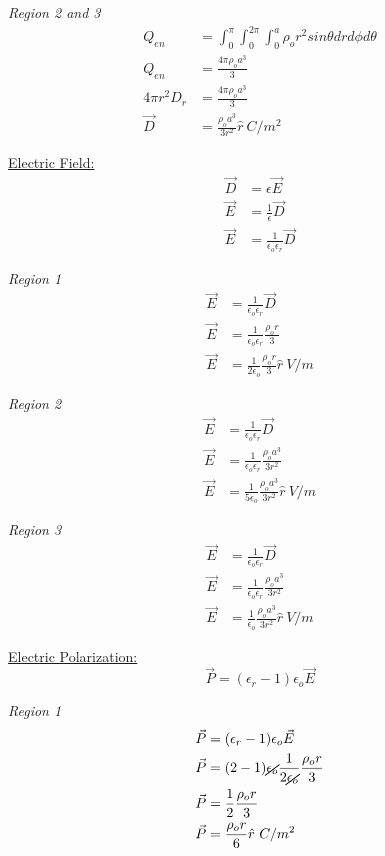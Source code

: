 \documentclass[12pt]{article}
\begin{document}
\textit{Region 2 and 3}			
	\begin{align*}
		Q_{en} &= \int_0^\pi \int_0^{2\pi} \int_0^a \rho_o r^2 sin\theta dr d\phi d\theta \\	
		Q_{en} &= \frac{4\pi \rho_o a^3}{3} \\
		4\pi r^2 D_r &= \frac{4\pi \rho_o a^3}{3} \\
		\vec{D} &= \frac{\rho_o a^3}{3 r^2} \hat{r}~C/m^2
	\end{align*}
		
\underline{Electric Field:}
	\begin{align*}
		\vec{D} &= \epsilon \vec{E} \\
		\vec{E} &= \frac{1}{\epsilon} \vec{D} \\
		\vec{E} &= \frac{1}{\epsilon_o \epsilon_r} \vec{D}
	\end{align*}
	
\textit{Region 1}			
	\begin{align*}
		\vec{E} &= \frac{1}{\epsilon_o \epsilon_r} \vec{D} \\
		\vec{E} &= \frac{1}{\epsilon_o \epsilon_r} \frac{\rho_o r}{3} \\
		\vec{E} &= \frac{1}{2 \epsilon_o} \frac{\rho_o r}{3} \hat{r}~V/m
	\end{align*}
	
\textit{Region 2}			
	\begin{align*}
		\vec{E} &= \frac{1}{\epsilon_o \epsilon_r} \vec{D} \\
		\vec{E} &= \frac{1}{\epsilon_o \epsilon_r} \frac{\rho_o a^3}{3 r^2} \\
		\vec{E} &= \frac{1}{5 \epsilon_o} \frac{\rho_o a^3}{3 r^2} \hat{r}~V/m
	\end{align*}
	
\textit{Region 3}			
	\begin{align*}
		\vec{E} &= \frac{1}{\epsilon_o \epsilon_r} \vec{D} \\
		\vec{E} &= \frac{1}{\epsilon_o \epsilon_r} \frac{\rho_o a^3}{3 r^2} \\
		\vec{E} &= \frac{1}{\epsilon_o} \frac{\rho_o a^3}{3 r^2} \hat{r}~V/m
	\end{align*}
		
\underline{Electric Polarization:}
	$$\vec{P} = (\epsilon_r - 1)\epsilon_o \vec{E}$$
	
\textit{Region 1}			
	\begin{align*}
		\vec{P} &= (\epsilon_r - 1)\epsilon_o \vec{E} \\
		\vec{P} &= (2 - 1) \cancel{\epsilon_o} \frac{1}{2 \cancel{\epsilon_o}} \frac{\rho_o r}{3} \\
		\vec{P} &= \frac{1}{2} \frac{\rho_o r}{3} \\
		\vec{P} &= \frac{\rho_o r}{6} \hat{r}~C/m^2
	\end{align*}
	
\end{document}
